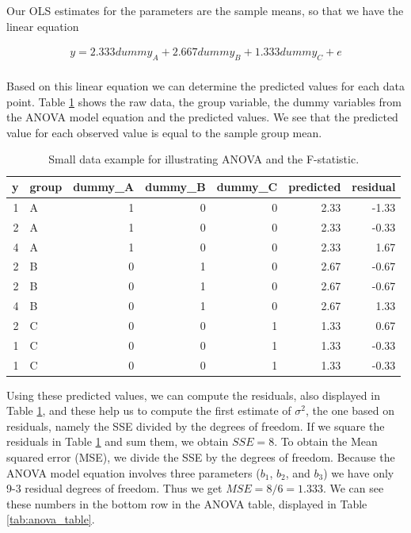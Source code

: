 \documentclass[]{book}\usepackage[]{graphicx}\usepackage[]{color}
\begin{document}
Our OLS estimates for the parameters are the sample means, so that we have the linear equation


\begin{eqnarray}
y = 2.333 dummy_A + 2.667 dummy_B + 1.333 dummy_C + e\\
\end{eqnarray}

Based on this linear equation we can determine the predicted values for each data point. Table \ref{tab:anova_data_table} shows the raw data, the group variable, the dummy variables from the ANOVA model equation and the predicted values. We see that the predicted value for each observed value is equal to the sample group mean.  

\begin{table}[ht]
\centering
\caption{Small data example for illustrating ANOVA and the F-statistic.} 
\label{tab:anova_data_table}
\begin{tabular}{rlrrrrr}
  \hline
y & group & dummy\_A & dummy\_B & dummy\_C & predicted & residual \\ 
  \hline
1 & A & 1 & 0 & 0 & 2.33 & -1.33 \\ 
  2 & A & 1 & 0 & 0 & 2.33 & -0.33 \\ 
  4 & A & 1 & 0 & 0 & 2.33 & 1.67 \\ 
  2 & B & 0 & 1 & 0 & 2.67 & -0.67 \\ 
  2 & B & 0 & 1 & 0 & 2.67 & -0.67 \\ 
  4 & B & 0 & 1 & 0 & 2.67 & 1.33 \\ 
  2 & C & 0 & 0 & 1 & 1.33 & 0.67 \\ 
  1 & C & 0 & 0 & 1 & 1.33 & -0.33 \\ 
  1 & C & 0 & 0 & 1 & 1.33 & -0.33 \\ 
   \hline
\end{tabular}
\end{table}



Using these predicted values, we can compute the residuals, also displayed in Table \ref{tab:anova_data_table}, and these help us to compute the first estimate of $\sigma^2$, the one based on residuals, namely the SSE divided by the degrees of freedom. If we square the residuals in Table \ref{tab:anova_data_table} and sum them, we obtain $SSE = 8$. To obtain the Mean squared error (MSE), we divide the SSE by the degrees of freedom. Because the ANOVA model equation involves three parameters ($b_1$, $b_2$, and $b_3$) we have only 9-3 residual degrees of freedom. Thus we get $MSE = 8/6 = 1.333$. We can see these numbers in the bottom row in the ANOVA table, displayed in Table \ref{tab:anova_table}.
\end{document}

